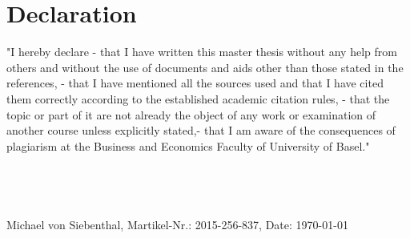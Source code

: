   \section*{Declaration}

  "I hereby declare - that I have written this master thesis without any help 
  from others and without the use of documents and aids other than those stated 
  in the references, - that I have mentioned all the sources used and that I 
  have cited them correctly according to the established academic citation rules, 
  - that the topic or part of it are not already the object of any work or 
  examination of another course unless explicitly stated,- that I am aware of 
  the consequences of plagiarism at the Business and Economics Faculty of University of Basel."\\\\\\\\\\
  Michael von Siebenthal, Martikel-Nr.: 2015-256-837, Date: \today
